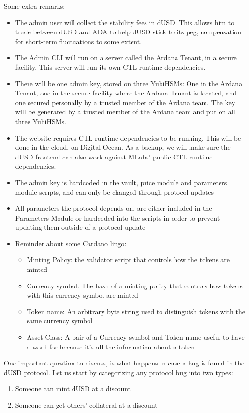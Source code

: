 \documentclass{article} %
\begin{document}
Some extra remarks:
\begin{itemize}
  \item The admin user will collect the stability fees in dUSD. This allows him
    to trade between dUSD and ADA to help dUSD stick to its peg, compensation
    for short-term fluctuations to some extent.
  \item The Admin CLI will run on a server called the Ardana Tenant, in a secure
    facility. This server will run its own CTL runtime dependencies.
  \item There will be one admin key, stored on three YubiHSMs: One in the Ardana
    Tenant, one in the secure facility where the Ardana Tenant is located, and
    one secured personally by a trusted member of the Ardana team. The key will
    be generated by a trusted member of the Ardana team and put on all three
    YubiHSMs.
  \item The website requires CTL runtime dependencies to be running. This will
    be done in the cloud, on Digital Ocean. As a backup, we will make sure the
    dUSD frontend can also work against MLabs' public CTL runtime dependencies.
  \item The admin key is hardcoded in the vault, price module and parameters
    module scripts, and can only be changed through protocol updates
  \item All parameters the protocol depends on, are either included in the
    Parameters Module or hardcoded into the scripts in order to prevent updating
    them outside of a protocol update
  \item Reminder about some Cardano lingo:
    \begin{itemize}
      \item Minting Policy: the validator script that controls how the tokens
        are minted
      \item Currency symbol: The hash of a minting policy that controls how
        tokens with this currency symbol are minted
      \item Token name: An arbitrary byte string used to distinguish tokens with
        the same currency symbol
      \item Asset Class: A pair of a Currency symbol and Token name useful to
    have a word for because it's all the information about a token
    \end{itemize}
\end{itemize}

One important question to discuss, is what happens in case a bug is found in the
dUSD protocol. Let us start by categorizing any protocol bug into two types:
\begin{enumerate}
  \item Someone can mint dUSD at a discount
  \item Someone can get others' collateral at a discount
\end{enumerate}
\end{document}
